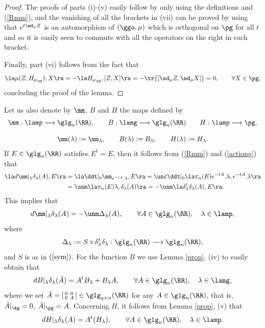 \documentclass[11pt]{amsart}
\theoremstyle{plain}
\theoremstyle{definition}
\theoremstyle{remark}
\begin{document}
\begin{proof}
The proofs of parts (i)-(v) easily follow by only using the definitions and (\ref{Rmm}), and the vanishing of all the brackets in (vii) can be proved by using that $e^{t\ad_{\mu}{Z}}$ is an automorphism of $(\ggo,\mu)$ which is orthogonal on $\pg$ for all $t$ and so it is easily seen to commute with all the operators on the right in each bracket.

Finally, part (vi) follows from the fact that
$$
\la\mu(Z,H_{\mu_{\pg}}),X\ra=-\la H_{\mu_{\pg}},[Z,X]\ra=-\tr{[\ad_{\mu}{Z},\ad_{\mu}{X}]}=0, \qquad\forall X\in\pg,
$$
concluding the proof of the lemma.
\end{proof}


Let us also denote by $\mm$, $B$ and $H$ the maps defined by
$$
\begin{array}{c}
\mm:\lamp\longrightarrow\glg_n(\RR), \qquad B:\lamg\longrightarrow\glg_n(\RR)\qquad H:\lamp\longrightarrow\pg, \\ \\
\mm(\lambda):=\mm_{\lambda}, \qquad B(\lambda):=B_{\lambda}, \qquad H(\lambda):=H_{\lambda}.
\end{array}
$$
If $E\in\glg_n(\RR)$ satisfies $E^t=E$, then it
follows from (\ref{Rmm}) and (\ref{actiong}) that
\begin{align*}
\la d \mm|_{\lambda}\delta_{\lambda}(A),E\ra &= \la\ddt|_0
\mm_{e^{-tA}.\lambda},E\ra
= \unc\ddt|_0\la\pi_n(E)e^{-tA}.\lambda,e^{-tA}.\lambda\ra \\
&= \unm\la\pi_n(E)\lambda,\delta_{\lambda}(A)\ra =
-\unm\la\delta_{\lambda}^t\delta_{\lambda}(A),E\ra.
\end{align*}
This implies that
\begin{equation}\label{dR}
d \mm|_{\lambda}\delta_{\lambda}(A)=-\unm\Delta_{\lambda}(A), \qquad\forall
A\in\glg_n(\RR), \quad \lambda\in\lamp,
\end{equation}
where
$$
\Delta_{\lambda}:=S\circ\delta_{\lambda}^t\delta_{\lambda}:\glg_n(\RR)\longrightarrow\glg_n(\RR),
$$
and $S$ is as in $(\ref{sym})$.  For the function $B$ we use Lemma \ref{prop}, (iv) to easily obtain that
\begin{equation}\label{dB}
d B|_{\lambda}\delta_{\lambda}(\tilde{A})=A^tB_{\lambda}+B_{\lambda}A,  \qquad\forall
A\in\glg_n(\RR), \quad \lambda\in\lamg,
\end{equation}
where we set $\tilde{A}=\left[\begin{smallmatrix} 0&0\\ 0&A
\end{smallmatrix}\right]\in\glg_{q+n}(\RR)$ for any $A\in\glg_n(\RR)$, that is, $\tilde{A}|_{\kg}=0$, $\tilde{A}|_{\pg}=A$.  Concerning $H$, it follows from Lemma \ref{prop}, (v) that
\begin{equation}\label{dH}
d H|_{\lambda}\delta_{\lambda}(A)=A^t(H_{\lambda}),  \qquad\forall A\in\glg_n(\RR), \quad \lambda\in\lamp.
\end{equation}
\end{document}
